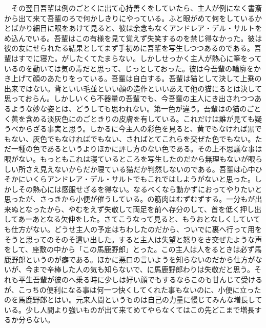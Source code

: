 \documentclass[a5j]{ltjtbook}
\begin{document}
　その翌日吾輩は例のごとくに出て心持善くをしていたら、主人が例になく書斎から出て来て吾輩のろで何かしきりにやっている。ふと眼がめて何をしているかとばかり細目に眼をあけて見ると、彼は余念もなくアンドレア・デル・サルトをめ込んでいる。吾輩はこの有様を見て覚えず失笑するのを禁じ得なかった。彼は彼の友にせられたる結果としてまず手初めに吾輩を写生しつつあるのである。吾輩はすでに寝た。がしたくてたまらない。しかしせっかく主人が熱心に筆をっているのを動いては気の毒だと思って、じっとしておった。彼は今吾輩の輪廓をかき上げて顔のあたりをっている。吾輩は自白する。吾輩は猫として決して上乗の出来ではない。背といい毛並といい顔の造作といいあえて他の猫にるとは決して思っておらん。しかしいくら不器量の吾輩でも、今吾輩の主人にき出されつつあるような妙な姿とは、どうしても思われない。第一色が違う。吾輩はの猫のごとく黄を含める淡灰色にのごときりの皮膚を有している。これだけは誰が見ても疑うべからざる事実と思う。しかるに今主人の彩色を見ると、黄でもなければ黒でもない、灰色でもなければでもない、さればとてこれらを交ぜた色でもない。ただ一種の色であるというよりほかに評し方のない色である。その上不思議な事は眼がない。もっともこれは寝ているところを写生したのだから無理もないが眼らしい所さえ見えないからだか寝ている猫だか判然しないのである。吾輩は心中ひそかにいくらアンドレア・デル・サルトでもこれではしようがないと思った。しかしその熱心には感服せざるを得ない。なるべくなら動かずにおってやりたいと思ったが、さっきから小便が催うしている。の筋肉はむずむずする。一分もが出来ぬとなったから、やむをえず失敬して両足を前へ存分のして、首を低く押し出してあーあとなる欠伸をした。さてこうなって見ると、もうおとなしくしていても仕方がない。どうせ主人の予定はちわしたのだから、ついでに裏へ行って用をそうと思ってのそのそ這い出した。すると主人は失望と怒りをき交ぜたような声をして、座敷の中から「この馬鹿野郎」とった。この主人は人をるときは必ず馬鹿野郎というのが癖である。ほかに悪口の言いようを知らないのだから仕方がないが、今まで辛棒した人の気も知らないで、に馬鹿野郎わりは失敬だと思う。それも平生吾輩が彼のへ乗る時に少しは好い顔でもするならこのも甘んじて受けるが、こっちの便利になる事は何一つ快くしてくれた事もないのに、小便に立ったのを馬鹿野郎とはい。元来人間というものは自己の力量に慢じてみんな増長している。少し人間より強いものが出て来てめてやらなくてはこの先どこまで増長するか分らない。 \newline
\end{document}
